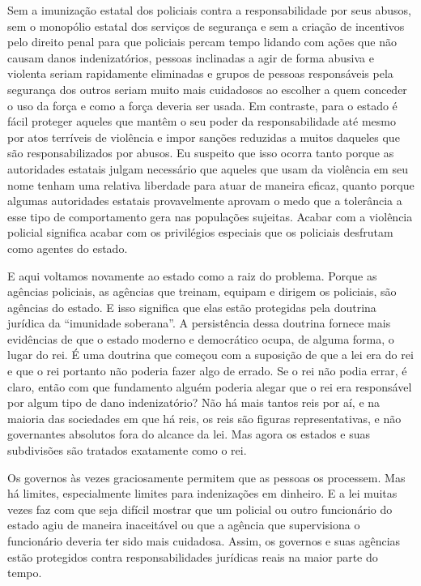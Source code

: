 Sem a imunização estatal dos policiais contra a responsabilidade por seus abusos, sem o monopólio estatal dos serviços de segurança e sem a criação de incentivos pelo direito penal para que policiais percam tempo lidando com ações que não causam danos indenizatórios, pessoas inclinadas a agir de forma abusiva e violenta seriam rapidamente eliminadas e grupos de pessoas responsáveis pela segurança dos outros seriam muito mais cuidadosos ao escolher a quem conceder o uso da força e como a força deveria ser usada. Em contraste, para o estado é fácil proteger aqueles que mantêm o seu poder da responsabilidade até mesmo por atos terríveis de violência e impor sanções reduzidas a muitos daqueles que são responsabilizados por abusos. Eu suspeito que isso ocorra tanto porque as autoridades estatais julgam necessário que aqueles que usam da violência em seu nome tenham uma relativa liberdade para atuar de maneira eficaz, quanto porque algumas autoridades estatais provavelmente aprovam o medo que a tolerância a esse tipo de comportamento gera nas populações sujeitas. Acabar com a violência policial significa acabar com os privilégios especiais que os policiais desfrutam como agentes do estado.

E aqui voltamos novamente ao estado como a raiz do problema. Porque as agências policiais, as agências que treinam, equipam e dirigem os policiais, são agências do estado. E isso significa que elas estão protegidas pela doutrina jurídica da ``imunidade soberana''. A persistência dessa doutrina fornece mais evidências de que o estado moderno e democrático ocupa, de alguma forma, o lugar do rei. É uma doutrina que começou com a suposição de que a lei era do rei e que o rei portanto não poderia fazer algo de errado. Se o rei não podia errar, é claro, então com que fundamento alguém poderia alegar que o rei era responsável por algum tipo de dano indenizatório? Não há mais tantos reis por aí, e na maioria das sociedades em que há reis, os reis são figuras representativas, e não governantes absolutos fora do alcance da lei. Mas agora os estados e suas subdivisões são tratados exatamente como o rei.

Os governos às vezes graciosamente permitem que as pessoas os processem. Mas há limites, especialmente limites para indenizações em dinheiro. E a lei muitas vezes faz com que seja difícil mostrar que um policial ou outro funcionário do estado agiu de maneira inaceitável ou que a agência que supervisiona o funcionário deveria ter sido mais cuidadosa. Assim, os governos e suas agências estão protegidos contra responsabilidades jurídicas reais na maior parte do tempo.

